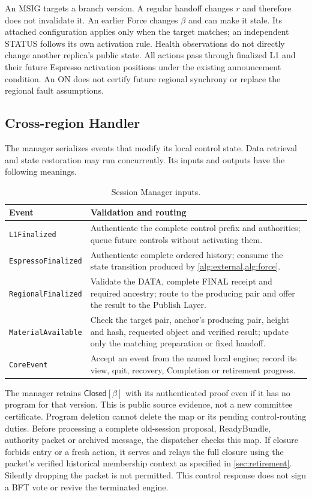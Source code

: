 \documentclass[11pt,a4paper]{article}
\newcommand{\tagg}[1]{\ensuremath{\mathsf{#1}}}
\begin{document}
An MSIG targets a branch version. A regular handoff changes $r$ and
therefore does not invalidate it. An earlier Force changes $\beta$ and
can make it stale. Its attached configuration applies only when the
target matches; an independent STATUS follows its own activation rule.
Health observations do not directly change another replica's public
state. All actions pass through finalized L1 and their future Espresso
activation positions under the existing announcement condition.
An ON does not certify future regional synchrony or replace the
regional fault assumptions.

\subsection{Cross-region Handler}
\label{sec:session-manager}
The manager serializes events that modify its local control state.
Data retrieval and state restoration may run concurrently. Its
inputs and outputs have the following meanings.

\begin{table}[htbp]\centering\small
\caption{Session Manager inputs.}
\label{tab:manager-inputs}
\begin{tabularx}{\linewidth}{@{}>{\raggedright\arraybackslash}p{.24\linewidth}Y@{}}\toprule
Event & Validation and routing\\\midrule
\texttt{L1Finalized} & Authenticate the complete control prefix and
authorities; queue future controls without activating them.\\
\texttt{EspressoFinalized} & Authenticate complete ordered history;
consume the state transition produced by \cref{alg:external,alg:force}.\\
\texttt{RegionalFinalized} & Validate the DATA, complete FINAL receipt
and required ancestry; route to the producing pair and offer the result
to the Publish Layer.\\
\texttt{MaterialAvailable} & Check the target pair, anchor's producing
pair, height and hash, requested object and verified result; update only
the matching preparation or fixed handoff.\\
\texttt{CoreEvent} & Accept an event from the named local engine;
record its view, quit, recovery, Completion or retirement progress.\\\bottomrule
\end{tabularx}
\end{table}

The manager retains $\tagg{Closed}[\beta]$ with its authenticated proof
even if it has no program for that version. This is public source evidence,
not a new committee certificate. Program deletion cannot delete the map
or its pending control-routing duties. Before processing a complete
old-session proposal, ReadyBundle, authority packet or archived message,
the dispatcher checks this map. If closure forbids entry or a fresh
action, it serves and relays the full closure using the packet's verified
historical membership context as specified in \cref{sec:retirement}.
Silently dropping the packet is not permitted. This control response
does not sign a BFT vote or revive the terminated engine.
\end{document}
